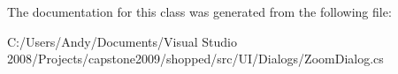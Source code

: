 The documentation for this class was generated from the following file:\begin{DoxyCompactItemize}
\item 
C:/Users/Andy/Documents/Visual Studio 2008/Projects/capstone2009/shopped/src/UI/Dialogs/ZoomDialog.cs\end{DoxyCompactItemize}
